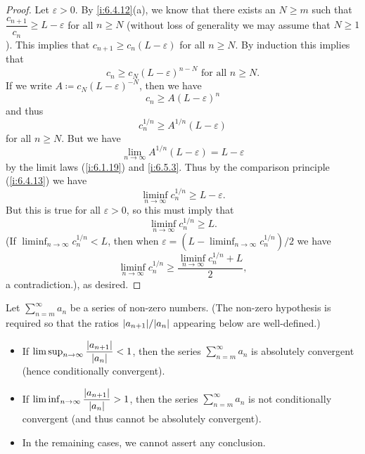 \begin{proof}
  Let \(\varepsilon > 0\).
  By \cref{i:6.4.12}(a), we know that there exists an \(N \geq m\) such that \(\dfrac{c_{n + 1}}{c_n} \geq L - \varepsilon\) for all \(n \geq N\)
  (without loss of generality we may assume that \(N \geq 1\)).
  This implies that \(c_{n + 1} \geq c_n (L - \varepsilon)\) for all \(n \geq N\).
  By induction this implies that
  \[
    c_n \geq c_N (L - \varepsilon)^{n - N} \text{ for all } n \geq N.
  \]
  If we write \(A \coloneqq c_N (L - \varepsilon)^{-N}\), then we have
  \[
    c_n \geq A(L - \varepsilon)^n
  \]
  and thus
  \[
    c_n^{1 / n} \geq A^{1 / n} (L - \varepsilon)
  \]
  for all \(n \geq N\).
  But we have
  \[
    \lim_{n \to \infty} A^{1 / n} (L - \varepsilon) = L - \varepsilon
  \]
  by the limit laws (\cref{i:6.1.19}) and \cref{i:6.5.3}.
  Thus by the comparison principle (\cref{i:6.4.13}) we have
  \[
    \liminf_{n \to \infty} c_n^{1 / n} \geq L - \varepsilon.
  \]
  But this is true for all \(\varepsilon > 0\), so this must imply that
  \[
    \liminf_{n \to \infty} c_n^{1 / n} \geq L.
  \]
  (If \(\liminf_{n \to \infty} c_n^{1 / n} < L\), then when \(\varepsilon = (L - \liminf_{n \to \infty} c_n^{1 / n}) / 2\) we have
  \[
    \liminf_{n \to \infty} c_n^{1 / n} \geq \dfrac{\liminf_{n \to \infty} c_n^{1 / n} + L}{2},
  \]
  a contradiction.), as desired.
\end{proof}

\begin{cor}\label{i:7.5.3}
  Let \(\sum_{n = m}^\infty a_n\) be a series of non-zero numbers.
  (The non-zero hypothesis is required so that the ratios \(\abs{a_{n + 1}} / \abs{a_n}\) appearing below are well-defined.)
  \begin{itemize}
    \item If \(\limsup_{n \to \infty} \dfrac{\left\lvert a_{n + 1}\right\rvert}{\left\lvert a_n\right\rvert} < 1\), then the series \(\sum_{n = m}^\infty a_n\) is absolutely convergent (hence conditionally convergent).
    \item If \(\liminf_{n \to \infty} \dfrac{\left\lvert a_{n + 1}\right\rvert}{\left\lvert a_n\right\rvert} > 1\), then the series \(\sum_{n = m}^\infty a_n\) is not conditionally convergent (and thus cannot be absolutely convergent).
    \item In the remaining cases, we cannot assert any conclusion.
  \end{itemize}
\end{cor}

